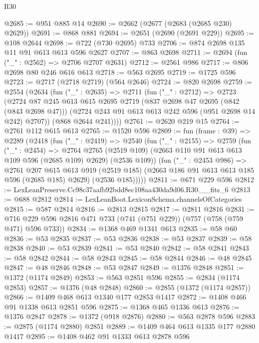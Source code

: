 \begin{lexlean}{R30}
\begin{coremodule}
@2685 := @951 @885 @14
@2690 := @2662 (@2677 (@2683 (@2685 @230) @2629))
@2691 := @868 @881
@2694 := @2651 (@2690 (@2691 @229))
@2695 := @108 @2644
@2698 := @722 (@730 @2695) @733
@2706 := @874 @2698 @135 @11 @91 @613 @613 @596 @2627
@2707 := @863 @2698
@2711 := @2694 (fun ("_" : @2562) => @2706 @2707 @2631)
@2712 := @2561 @986
@2717 := @806 @2698 @80 @246 @616 @613
@2718 := @563 @2695
@2719 := @1725 @596
@2723 := @2717 (@2718 @2719) (@564 @2646)
@2724 := @820 @2698
@2759 := @2554
    (@2634
      (fun ("_" : @2635) =>
      @2711
        (fun ("_" : @2712) =>
        @2723
          (@2724
            @87
            @245
            @613
            @615
            @2695
            @2719
            (@837 @2698 @47 @2695 (@842 (@843 @2698 @47)))
            (@2724 @243 @91 @613 @613 @242 @596 (@951 @2698 @14 @242) @2707))
          (@868 @2644 @241))))
@2761 := @2620 @219 @15
@2764 := @2761 @112 @615 @613
@2765 := @1520 @596
@2809 := fun (frame : @39) =>
  @2289
    (@2418
      (fun ("_" : @2419) =>
      @2540
        (fun ("_" : @2155) =>
        @2759
          (fun ("_" : @2454) =>
          @2764
            @2765
            (@2519 @109)
            (@2663 @110 @91 @613 @613 @109 @596 (@2685 @109) @2629)
            (@2536 @109))
          (fun ("_" : @2453 @986) =>
          @2761
            @207
            @615
            @613
            @919
            (@2519 @185)
            (@2663 @186 @91 @613 @613 @185 @596 (@2685 @185) @2629)
            (@2536 @185)))))
@2811 := @671 @229 @596
@2812 := LexLeanPreserve.Cc98c37aafb92bdd8ec108aa430da9d06.R30.__fits_6
@2813 := @688 @2812
@2814 := LexLeanBoot.LexiconSchema.channelsOfCategories
@2815 := @587 @2814
@2816 := @2813 @2815
@2817 := @2811 @2816
@2831 := @716 @229 @596 @2816 @471 @733 (@741 (@751 @229)) (@757 (@758 (@759 @471) @596 @733))
@2834 := @1368 @469 @1341 @613
@2835 := @58 @60
@2836 := @53 @2835
@2837 := @53 @2836
@2838 := @53 @2837
@2839 := @58 @2838
@2840 := @53 @2839
@2841 := @53 @2840
@2842 := @58 @2841
@2843 := @58 @2842
@2844 := @58 @2843
@2845 := @58 @2844
@2846 := @48 @2845
@2847 := @48 @2846
@2848 := @53 @2847
@2849 := @1376 @2848
@2851 := @1372 (@1174 @2849)
@2853 := @563 @2851 @596
@2855 := @2834 (@1174 @2853)
@2857 := @1376 (@48 @2848)
@2860 := @2855 (@1372 (@1174 @2857))
@2866 := @1409 @468 @613 @1340 @177 @2853 @1417
@2872 := @1408 @466 @91 @1338 @613 @2851 @596
@2875 := @1368 @465 @1336 @613
@2876 := @1376 @2847
@2878 := @1372 (@918 @2876)
@2880 := @563 @2878 @596
@2883 := @2875 (@1174 @2880) @2851
@2889 := @1409 @464 @613 @1335 @177 @2880 @1417
@2895 := @1408 @462 @91 @1333 @613 @2878 @596

\end{coremodule}
\end{lexlean}
